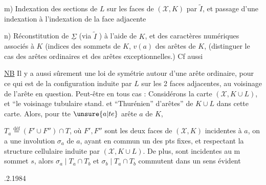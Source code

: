 m) Indexation des sections de $L$ sur les faces de $(\mathcal X,K)$  par $\widetilde I$, et passage d'une indexation à l'indexation de la face adjacente

n) Réconstitution de  $\underline{\Sigma}$ (via $\widetilde I$ \unsure{---}) à l'aide de $K$, et des caractères numériques associés à $K$ (indices des  sommets de $K$,  $v(a)$ des arêtes  de $K$,  (distinguer le cas des arêtes ordinaires et des arêtes exceptionnelles.) Cf aussi

\uline{NB} Il y a aussi sûrement une loi de symétrie autour d'une arête ordinaire, pour ce qui est de la configuration induite par $L$ sur les 2 faces adjacentes, au voisinage de l'arête en question. Peut-être  en tous cas : Considérons la carte $(\mathcal X,K\cup L)$, et ``le voisinage tubulaire stand. et ``Thurénien'' d'arêtes'' de   $K\cup L$ dans cette carte.  Alors, pour tte $\unsure{a|te}$ arête $a$ de $K$, 


$T_a\overset{\mathrm{déf}}{=}(F'\cup F'')\cap T$, où $F',F''$ sont les deux faces de $(\mathcal X,K)$ incidentes à $a$, on a une involution \deleted{\unsure{$\varphi$}} $\sigma_a$ de $a$, ayant en commun un des pts fixes, et respectant la structure cellulaire induite par $(\mathcal X,K\cup L)$. De plus,  sont incidentes au m sommet $s$, alors $\sigma_a\mid T_a\cap T_b$ et $\sigma_b\mid T_a\cap T_b$ commutent dans un sens évident


.2.1984


